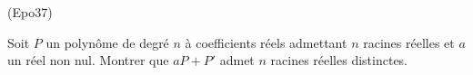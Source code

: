 \begin{tiny}(Epo37)\end{tiny} Soit $P$ un polynôme de degré $n$ à coefficients réels admettant $n$ racines réelles et $a$ un réel non nul. Montrer que $aP + P'$ admet $n$ racines réelles distinctes. 